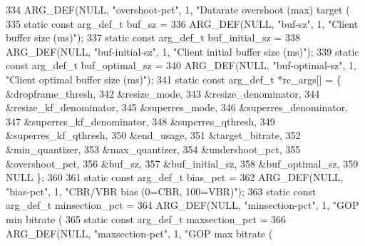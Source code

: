 \begin{DoxyCodeInclude}
{{{{334     ARG\_DEF(NULL, \textcolor{stringliteral}{"overshoot-pct"}, 1, \textcolor{stringliteral}{"Datarate overshoot (max) target (%
335 \textcolor{keyword}{static} \textcolor{keyword}{const} arg\_def\_t buf\_sz =
336     ARG\_DEF(NULL, \textcolor{stringliteral}{"buf-sz"}, 1, \textcolor{stringliteral}{"Client buffer size (ms)"});
337 \textcolor{keyword}{static} \textcolor{keyword}{const} arg\_def\_t buf\_initial\_sz =
338     ARG\_DEF(NULL, \textcolor{stringliteral}{"buf-initial-sz"}, 1, \textcolor{stringliteral}{"Client initial buffer size (ms)"});
339 \textcolor{keyword}{static} \textcolor{keyword}{const} arg\_def\_t buf\_optimal\_sz =
340     ARG\_DEF(NULL, \textcolor{stringliteral}{"buf-optimal-sz"}, 1, \textcolor{stringliteral}{"Client optimal buffer size (ms)"});
341 \textcolor{keyword}{static} \textcolor{keyword}{const} arg\_def\_t *rc\_args[] = \{ &dropframe\_thresh,
342                                       &resize\_mode,
343                                       &resize\_denominator,
344                                       &resize\_kf\_denominator,
345                                       &superres\_mode,
346                                       &superres\_denominator,
347                                       &superres\_kf\_denominator,
348                                       &superres\_qthresh,
349                                       &superres\_kf\_qthresh,
350                                       &end\_usage,
351                                       &target\_bitrate,
352                                       &min\_quantizer,
353                                       &max\_quantizer,
354                                       &undershoot\_pct,
355                                       &overshoot\_pct,
356                                       &buf\_sz,
357                                       &buf\_initial\_sz,
358                                       &buf\_optimal\_sz,
359                                       NULL \};
360 
361 \textcolor{keyword}{static} \textcolor{keyword}{const} arg\_def\_t bias\_pct =
362     ARG\_DEF(NULL, \textcolor{stringliteral}{"bias-pct"}, 1, \textcolor{stringliteral}{"CBR/VBR bias (0=CBR, 100=VBR)"});
363 \textcolor{keyword}{static} \textcolor{keyword}{const} arg\_def\_t minsection\_pct =
364     ARG\_DEF(NULL, \textcolor{stringliteral}{"minsection-pct"}, 1, \textcolor{stringliteral}{"GOP min bitrate (%
365 \textcolor{keyword}{static} \textcolor{keyword}{const} arg\_def\_t maxsection\_pct =
366     ARG\_DEF(NULL, \textcolor{stringliteral}{"maxsection-pct"}, 1, \textcolor{stringliteral}{"GOP max bitrate (%
}}}}}}}
\end{DoxyCodeInclude}
